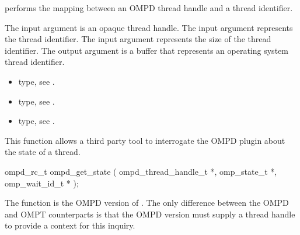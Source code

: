 \descr
{} performs the mapping between an OMPD
thread handle and a thread identifier.

\argdesc

The input argument  is an opaque thread handle.
The input argument   represents the thread
identifier. The input argument  represents the size of the 
thread identifier. The output argument  is a buffer that represents an operating 
system thread identifier.



\crossreferences
\begin{itemize}
	\item {} type, see .
	\item {} type, see .
	\item {} type, see .
\end{itemize}


\label{ompd:ompd_get_state}
\summary
This function allows a third party tool to interrogate the OMPD plugin about the state of a thread.

\format
\cspecificstart
\begin{boxedcode}
ompd\_rc\_t ompd\_get\_state (
  ompd\_thread\_handle\_t *,
  omp\_state\_t *,
  omp\_wait\_id\_t    *
);
\end{boxedcode}
\cspecificend

\descr
The function  is the  OMPD version of
. 
The only difference between the OMPD and OMPT counterparts
is that the OMPD version must supply a thread handle to provide
a context for this inquiry.

